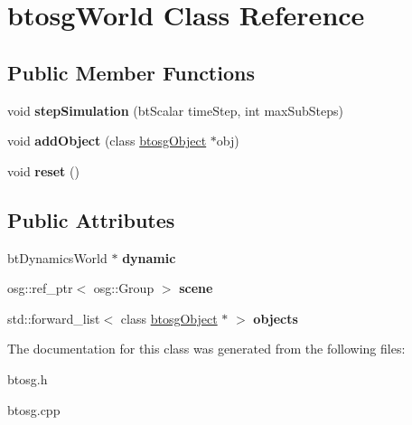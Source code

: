 \hypertarget{classbtosgWorld}{}\section{btosg\+World Class Reference}
\label{classbtosgWorld}
\subsection*{Public Member Functions}
\begin{DoxyCompactItemize}
\item 
\mbox{\label{classbtosgWorld_afce096686d8f84afd8b8fa3f2dc161b8}} 
void {\bfseries step\+Simulation} (bt\+Scalar time\+Step, int max\+Sub\+Steps)
\item 
\mbox{\label{classbtosgWorld_ae5b71c6319dd420479096a265a1725b7}} 
void {\bfseries add\+Object} (class \hyperlink{classbtosgObject}{btosg\+Object} $\ast$obj)
\item 
\mbox{\label{classbtosgWorld_a6af4d066410a86b44fff5563667ea9a9}} 
void {\bfseries reset} ()
\end{DoxyCompactItemize}
\subsection*{Public Attributes}
\begin{DoxyCompactItemize}
\item 
\mbox{\label{classbtosgWorld_ad757a7b3b845142f200d1f2127e5372e}} 
bt\+Dynamics\+World $\ast$ {\bfseries dynamic}
\item 
\mbox{\label{classbtosgWorld_ab6d438f54ccfc18955ea43e87731e008}} 
osg\+::ref\+\_\+ptr$<$ osg\+::\+Group $>$ {\bfseries scene}
\item 
\mbox{\label{classbtosgWorld_ab105aa8c0f8bdbdf323d47b902f6aca0}} 
std\+::forward\+\_\+list$<$ class \hyperlink{classbtosgObject}{btosg\+Object} $\ast$ $>$ {\bfseries objects}
\end{DoxyCompactItemize}


The documentation for this class was generated from the following files\+:\begin{DoxyCompactItemize}
\item 
btosg.\+h\item 
btosg.\+cpp\end{DoxyCompactItemize}
